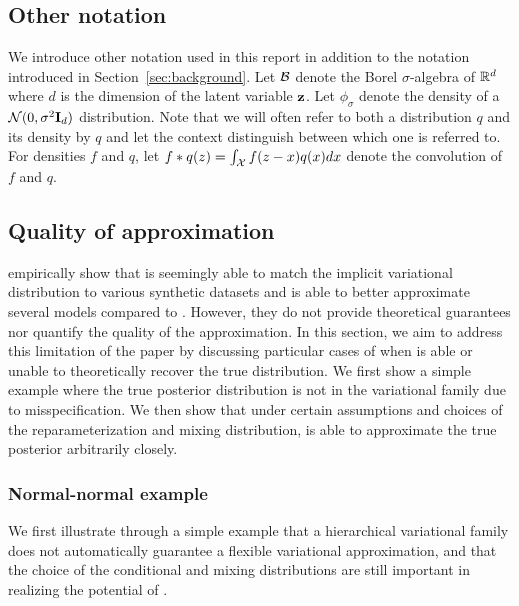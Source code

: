 \documentclass[10pt]{article}
\begin{document}
\subsection{Other notation} \label{sec:notation}

We introduce other notation used in this report in addition to the notation introduced in Section~\ref{sec:background}. Let $\mathcal{B}$ denote the Borel $\sigma$-algebra of $\mathbb{R}^d$ where $d$ is the dimension of the latent variable $\mathbf{z}$. Let $\phi_\sigma$ denote the density of a $\mathcal{N}(0,\sigma^2\mathbf{I}_d)$ distribution. Note that we will often refer to both a distribution $q$ and its density by $q$ and let the context distinguish between which one is referred to. For densities $f$ and $q$, let $f*q(z)=\int_{\mathcal{X}} f(z-x)q(x)dx$ denote the convolution of $f$ and $q$.


\subsection{Quality of approximation} \label{sec:approximation}

\citet{Titsias:2019} empirically show that \uivi is seemingly able to match the implicit variational distribution to various synthetic datasets and is able to better approximate several models compared to \sivi. However, they do not provide theoretical guarantees nor quantify the quality of the \uivi approximation. In this section, we aim to address this limitation of the paper by discussing particular cases of when \uivi is able or unable to theoretically recover the true distribution. We first show a simple example where the true posterior distribution is not in the variational family due to misspecification. We then show that under certain assumptions and choices of the reparameterization and mixing distribution, \uivi is able to approximate the true posterior arbitrarily closely.

\subsubsection{Normal-normal example}

We first illustrate through a simple example that a hierarchical variational family does not automatically guarantee a flexible variational approximation, and that the choice of the conditional and mixing distributions are still important in realizing the potential of \uivi.
\\
\end{document}
